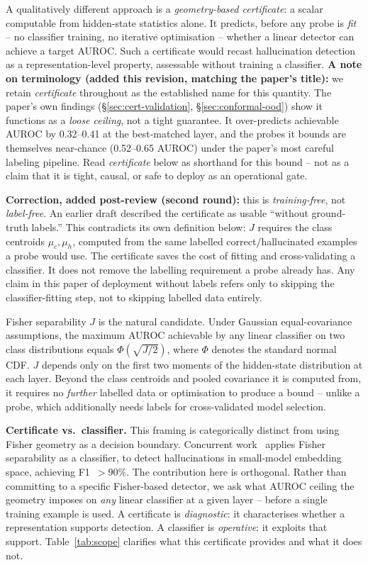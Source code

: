 \documentclass[10pt,twocolumn]{article}
\begin{document}
A qualitatively different approach is a \emph{geometry-based
certificate}: a scalar computable from hidden-state statistics alone.
It predicts, before any probe is \emph{fit} -- no classifier training,
no iterative optimisation -- whether a linear detector can achieve a
target AUROC. Such a certificate would recast hallucination detection
as a representation-level property, assessable without training a
classifier.
\textbf{A note on terminology (added this revision, matching the paper's
title):} we retain \emph{certificate} throughout as the established name
for this quantity. The paper's own findings (\S\ref{sec:cert-validation},
\S\ref{sec:conformal-ood}) show it functions as a \emph{loose ceiling},
not a tight guarantee. It over-predicts achievable AUROC by 0.32--0.41
at the best-matched layer, and the probes it bounds are themselves
near-chance (0.52--0.65 AUROC) under the paper's most careful labeling
pipeline. Read \emph{certificate} below as shorthand for this bound --
not as a claim that it is tight, causal, or safe to deploy as an
operational gate.

\textbf{Correction, added post-review (second round):} this is
\emph{training-free}, not \emph{label-free}. An earlier draft described
the certificate as usable ``without ground-truth labels.'' This
contradicts its own definition below: $J$ requires the class centroids
$\mu_c, \mu_h$, computed from the same labelled correct/hallucinated
examples a probe would use. The certificate saves the cost of fitting
and cross-validating a classifier. It does not remove the labelling
requirement a probe already has. Any claim in this paper of deployment
without labels refers only to skipping the classifier-fitting step, not
to skipping labelled data entirely.

Fisher separability $J$ is the natural candidate. Under Gaussian
equal-covariance assumptions, the maximum AUROC achievable by any linear
classifier on two class distributions equals $\Phi(\sqrt{J/2})$, where
$\Phi$ denotes the standard normal CDF. $J$ depends only on the first
two moments of the hidden-state distribution at each layer. Beyond the
class centroids and pooled covariance it is computed from, it requires
no \emph{further} labelled data or optimisation to produce a bound --
unlike a probe, which additionally needs labels for cross-validated
model selection.

\textbf{Certificate vs.\ classifier.}
This framing is categorically distinct from using Fisher geometry as a
decision boundary. Concurrent work~\citep{ricco2026geometric} applies
Fisher separability as a classifier, to detect hallucinations in
small-model embedding space, achieving F1~$>90\%$. The contribution here
is orthogonal. Rather than committing to a specific Fisher-based
detector, we ask what AUROC ceiling the geometry imposes on \emph{any}
linear classifier at a given layer -- before a single training example
is used. A certificate is \emph{diagnostic}: it characterises whether a
representation supports detection.
A classifier is \emph{operative}: it exploits that support.
Table~\ref{tab:scope} clarifies what this certificate provides and what
it does not.
\end{document}
